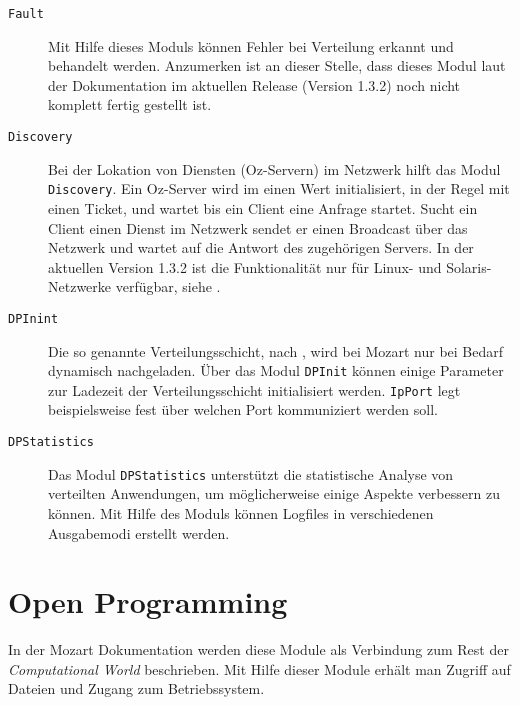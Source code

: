 \begin{description}
  \item[\texttt{Fault}] Mit Hilfe dieses Moduls können Fehler bei Verteilung
  erkannt und behandelt werden. Anzumerken ist an dieser Stelle, dass dieses
  Modul laut der Dokumentation \cite[System Modules, Part
  III]{url:mozart-documentation} im aktuellen
  Release (Version 1.3.2) noch nicht komplett fertig gestellt ist.
  
  \item[\texttt{Discovery}] Bei der Lokation von Diensten (Oz-Servern) im
  Netzwerk hilft das Modul \texttt{Discovery}. Ein Oz-Server wird im einen Wert
  initialisiert, in der Regel mit einen Ticket, und wartet bis ein Client eine
  Anfrage startet. Sucht ein Client einen Dienst im Netzwerk sendet er einen
  Broadcast über das Netzwerk und wartet auf die Antwort des zugehörigen
  Servers. In der aktuellen Version 1.3.2 ist die Funktionalität nur für Linux-
  und Solaris-Netzwerke verfügbar, siehe \cite[System Modules, Part
  III]{url:mozart-documentation}. 
  
  \item[\texttt{DPInint}] Die so genannte Verteilungsschicht, nach
  \cite[System Modules, Part III]{url:mozart-documentation}, wird bei Mozart nur
  bei Bedarf dynamisch
  nachgeladen. Über das Modul \texttt{DPInit} können einige Parameter zur
  Ladezeit der Verteilungsschicht initialisiert werden. \texttt{IpPort} legt
  beispielsweise fest über welchen Port kommuniziert werden soll. 
  
  \item[\texttt{DPStatistics}] Das Modul \texttt{DPStatistics} unterstützt die
  statistische Analyse von verteilten Anwendungen, um möglicherweise einige
  Aspekte verbessern zu können. Mit Hilfe des Moduls können Logfiles in
  verschiedenen Ausgabemodi erstellt werden. 
\end{description}

\section{Open Programming}

In der Mozart Dokumentation \cite[System Modules, Part
IV]{url:mozart-documentation}  werden diese Module
als Verbindung zum Rest der \textsl{Computational World} beschrieben. Mit Hilfe
dieser Module erhält man Zugriff auf Dateien und Zugang zum Betriebssystem.

